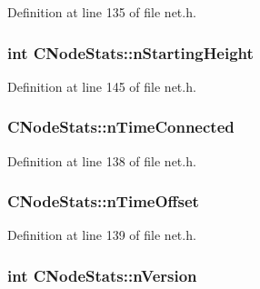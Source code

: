 Definition at line 135 of file net.\+h.

\hypertarget{class_c_node_stats_a86ff627e31f8ab881a8e11bb3acf4f19}{}
\subsubsection[{n\+Starting\+Height}]{\setlength{\rightskip}{0pt plus 5cm}int C\+Node\+Stats\+::n\+Starting\+Height}\label{class_c_node_stats_a86ff627e31f8ab881a8e11bb3acf4f19}


Definition at line 145 of file net.\+h.

\hypertarget{class_c_node_stats_a3d5133369e51db3c45839c8a68c662d1}{}
\subsubsection[{n\+Time\+Connected}]{ C\+Node\+Stats\+::n\+Time\+Connected}\label{class_c_node_stats_a3d5133369e51db3c45839c8a68c662d1}


Definition at line 138 of file net.\+h.

\hypertarget{class_c_node_stats_a905b33fdcf0443f25fa19ea4d10e8e59}{}
\subsubsection[{n\+Time\+Offset}]{ C\+Node\+Stats\+::n\+Time\+Offset}\label{class_c_node_stats_a905b33fdcf0443f25fa19ea4d10e8e59}


Definition at line 139 of file net.\+h.

\hypertarget{class_c_node_stats_ac8892d29d7c246e34e78fbc15ae77276}{}
\subsubsection[{n\+Version}]{\setlength{\rightskip}{0pt plus 5cm}int C\+Node\+Stats\+::n\+Version}\label{class_c_node_stats_ac8892d29d7c246e34e78fbc15ae77276}


